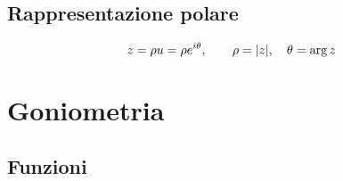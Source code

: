 \subsection{Rappresentazione polare}

\begin{equation}
    z = \rho u = \rho e^{i\theta}, \qquad \rho = {\left|z\right|}, \quad \theta = \arg{z}
\end{equation}

\section{Goniometria}


\subsection{Funzioni}

